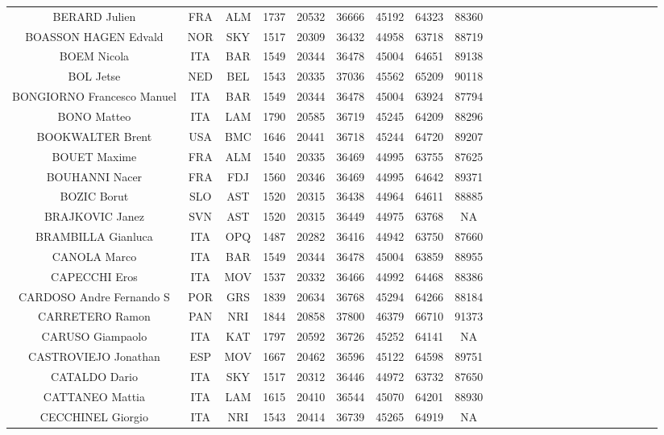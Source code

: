 \documentclass[10pt]{article}
\begin{document}
\begin{table}
\begin{tabular}{c c c c c c c c c c c c c c c c c c c c c c c c}
 BERARD Julien & FRA &  ALM &  1737 &  20532 &  36666 &  45192 &  64323 &  88360 \\
 BOASSON HAGEN Edvald & NOR &  SKY &  1517 &  20309 &  36432 &  44958 &  63718 &  88719 \\
 BOEM Nicola & ITA &  BAR &  1549 &  20344 &  36478 &  45004 &  64651 &  89138 \\
 BOL Jetse & NED &  BEL &  1543 &  20335 &  37036 &  45562 &  65209 &  90118 \\
 BONGIORNO Francesco Manuel & ITA &  BAR &  1549 &  20344 &  36478 &  45004 &  63924 &  87794 \\
 BONO Matteo & ITA &  LAM &  1790 &  20585 &  36719 &  45245 &  64209 &  88296 \\
 BOOKWALTER Brent & USA &  BMC &  1646 &  20441 &  36718 &  45244 &  64720 &  89207 \\
 BOUET Maxime & FRA &  ALM &  1540 &  20335 &  36469 &  44995 &  63755 &  87625 \\
 BOUHANNI Nacer & FRA &  FDJ &  1560 &  20346 &  36469 &  44995 &  64642 &  89371 \\
 BOZIC Borut & SLO &  AST &  1520 &  20315 &  36438 &  44964 &  64611 &  88885 \\
 BRAJKOVIC Janez & SVN &  AST &  1520 &  20315 &  36449 &  44975 &  63768 &  NA \\
 BRAMBILLA Gianluca & ITA &  OPQ &  1487 &  20282 &  36416 &  44942 &  63750 &  87660 \\
 CANOLA Marco & ITA &  BAR &  1549 &  20344 &  36478 &  45004 &  63859 &  88955 \\
 CAPECCHI Eros & ITA &  MOV &  1537 &  20332 &  36466 &  44992 &  64468 &  88386 \\
 CARDOSO Andre Fernando S & POR &  GRS &  1839 &  20634 &  36768 &  45294 &  64266 &  88184 \\
 CARRETERO Ramon & PAN &  NRI &  1844 &  20858 &  37800 &  46379 &  66710 &  91373 \\
 CARUSO Giampaolo & ITA &  KAT &  1797 &  20592 &  36726 &  45252 &  64141 &  NA \\
 CASTROVIEJO Jonathan & ESP &  MOV &  1667 &  20462 &  36596 &  45122 &  64598 &  89751 \\
 CATALDO Dario & ITA &  SKY &  1517 &  20312 &  36446 &  44972 &  63732 &  87650 \\
 CATTANEO Mattia & ITA &  LAM &  1615 &  20410 &  36544 &  45070 &  64201 &  88930 \\
 CECCHINEL Giorgio & ITA &  NRI &  1543 &  20414 &  36739 &  45265 &  64919 &  NA \\

\end{tabular}
\end{table}
\end{document}

